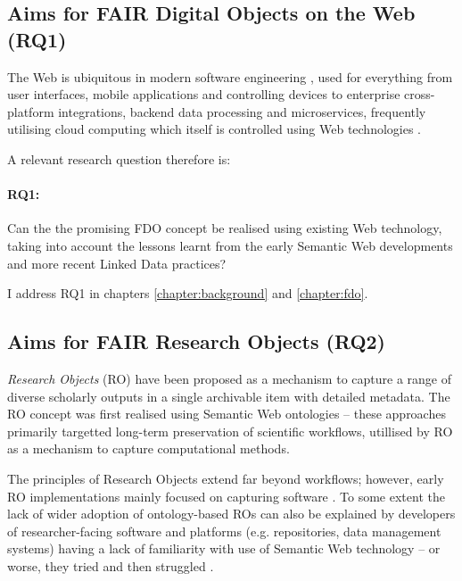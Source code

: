 \subsection{Aims for FAIR Digital Objects on the Web (RQ1)}
\label{intro:rq1}


The Web is ubiquitous in modern software engineering \cite{Taivalsaari 2021}, used for everything from user interfaces, mobile applications and controlling devices to enterprise cross-platform integrations, backend data processing and microservices, frequently utilising cloud computing which itself is controlled using Web technologies \cite{Marinescu 2023}.

A relevant research question therefore is: 

\paragraph{RQ1:}\label{rq1} 
Can the the promising FDO concept be realised using existing Web technology, taking into account the lessons learnt from the early Semantic Web developments and more recent Linked Data practices?

I address RQ1 in chapters \ref{chapter:background} and \ref{chapter:fdo}.


\subsection{Aims for FAIR Research Objects (RQ2)}
\label{intro:rq2}

\emph{Research Objects} (RO) \cite{Bechhofer 2013} have been proposed as a mechanism to capture a range of diverse scholarly outputs in a single archivable item with detailed metadata. The RO concept was first realised using Semantic Web ontologies \cite{myExperiment 2009,Belhajjame 2015} -- these approaches primarily targetted long-term preservation of scientific workflows, utillised by RO as a mechanism to capture computational methods.

The principles of Research Objects extend far beyond workflows; however, early RO implementations mainly focused on capturing software \cite{Goble 2018}. To some extent the lack of wider adoption of ontology-based ROs can also be explained by developers of researcher-facing software and platforms (e.g. repositories, data management systems) having a lack of familiarity with use of Semantic Web technology -- or worse, they tried and then struggled \cite{Carriero 2010,Tudorache 2020}.

